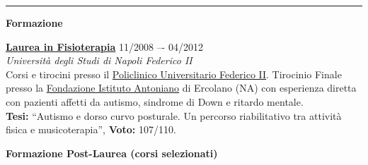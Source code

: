 \documentclass[a4paper]{article}
\newcommand{\block}[1]{\hrule \vspace{0.2cm} \textbf{\Large #1} \vspace{0.2cm}}
\newcommand{\blockNp}[1]{\newpage \textbf{\Large #1} \vspace{0.2cm}}
\newcommand{\voice}[5]{\href{#4}{\textbf{#1}} \hfill #2 \\ \textit{#3} \\ {\small #5} \vspace{0.2cm} \\}
\begin{document}

    \block{Formazione}

    \voice{Laurea in Fisioterapia}
    {11/2008 –- 04/2012}
    {Università degli Studi di Napoli Federico II%
    }
    {https://m78.corsidistudio.unina.it/}
    {
    Corsi e tirocini presso il \href{https://www.policlinico.unina.it/flex/cm/pages/ServeBLOB.php/L/IT/IDPagina/1}{Policlinico Universitario Federico II}.
    Tirocinio Finale presso la \href{https://www.istitutoantoniano.it/}{Fondazione Istituto Antoniano} di Ercolano (NA) con esperienza diretta con pazienti affetti da autismo, sindrome di Down e ritardo mentale.\\
    \textbf{Tesi:} “Autismo e dorso curvo posturale. Un percorso riabilitativo tra attività fisica e musicoterapia”,  \textbf{Voto:} 107/110.
    \vspace{-0.25cm}
    }

    \clearpage

    \blockNp{Formazione Post-Laurea (corsi selezionati)}
\end{document}
